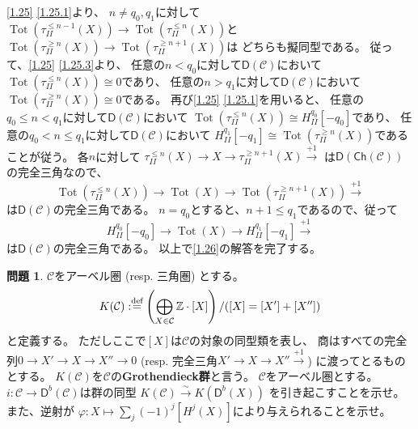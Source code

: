 \documentclass[uplatex,dvipdfmx]{jsarticle}
\makeatletter
\theoremstyle{definition}
\newtheorem{prob}[prob]{問題}
\renewenvironment{proof}[1][\proofname]{
  \pushQED{\qed}%
  \normalfont \topsep6\p@\@plus6\p@\relax
  \trivlist
  \item[\hskip\labelsep
    #1\@addpunct{\textbf{.}}]\ignorespaces
}{%
  \popQED\endtrivlist\@endpefalse
}
\providecommand{\proofname}{証明}
\DeclareMathOperator{\Tot}{\mathrm{Tot}}
\newcommand{\Ch}{\mathsf{Ch}}
\newcommand{\sfD}{\mathsf{D}}
\newcommand\Z{\mathbb{Z}}
\newcommand\mcC{\mathcal{C}}
\def\dfn{:\overset{\mbox{{\scriptsize def}}}{=}}
\makeatother
\begin{document}
\begin{proof}
  \autoref{1.25} \ref{1.25.1}より、
  \(n\neq q_0,q_1\)に対して
  \(\Tot(\tau_{II}^{\leq n-1}(X)) \to \Tot(\tau_{II}^{\leq n}(X))\)と
  \(\Tot(\tau_{II}^{\geq n}(X)) \to \Tot(\tau_{II}^{\geq n+1}(X))\)は
  どちらも擬同型である。
  従って、\autoref{1.25} \ref{1.25.3}より、
  任意の\(n < q_0\)に対して\(\sfD(\mcC)\)において
  \(\Tot(\tau_{II}^{\leq n}(X)) \cong 0\)であり、
  任意の\(n > q_1\)に対して\(\sfD(\mcC)\)において
  \(\Tot(\tau_{II}^{\geq n}(X)) \cong 0\)である。
  再び\autoref{1.25} \ref{1.25.1}を用いると、
  任意の\(q_0 \leq n < q_1\)に対して\(\sfD(\mcC)\)において
  \(\Tot(\tau_{II}^{\leq n}(X)) \cong H_{II}^{q_0}[-q_0]\)であり、
  任意の\(q_0 < n \leq q_1\)に対して\(\sfD(\mcC)\)において
  \(H_{II}^{q_1}[-q_1] \cong \Tot(\tau_{II}^{\geq n}(X))\)であることが従う。
  各\(n\)に対して
  \(\tau_{II}^{\leq n}(X) \to X \to \tau_{II}^{\geq n+1}(X)\xrightarrow{+1}\)
  は\(\sfD(\Ch(\mcC))\)の完全三角なので、
  \[
  \Tot(\tau_{II}^{\leq n}(X)) \to \Tot(X)
  \to \Tot(\tau_{II}^{\geq n+1}(X)) \xrightarrow{+1}
  \]
  は\(\sfD(\mcC)\)の完全三角である。
  \(n=q_0\)とすると、\(n+1\leq q_1\)であるので、従って
  \[
  H_{II}^{q_0}[-q_0] \to \Tot(X) \to H_{II}^{q_1}[-q_1] \xrightarrow{+1}
  \]
  は\(\sfD(\mcC)\)の完全三角である。
  以上で\autoref{1.26}の解答を完了する。
\end{proof}






\begin{prob}\label{1.27}
  \(\mcC\)をアーベル圏 (resp. 三角圏) とする。
  \[K(\mcC)\dfn \left(\bigoplus_{X\in \mcC} \Z\cdot [X]\right)/([X]=[X']+[X''])\]
  と定義する。
  ただしここで\([X]\)は\(\mcC\)の対象の同型類を表し、
  商はすべての完全列\(0\to X'\to X\to X''\to 0\)
  (resp. 完全三角\(X'\to X \to X'' \xrightarrow{+1}\))
  に渡ってとるものとする。
  \(K(\mcC)\)を\(\mcC\)の\textbf{Grothendieck群}と言う。
  \(\mcC\)をアーベル圏とする。
  \(i:\mcC \to \sfD^b(\mcC)\)は群の同型
  \(K(\mcC) \xrightarrow{\sim} K(\sfD^b(X))\)
  を引き起こすことを示せ。
  また、逆射が
  \(\varphi:X\mapsto \sum_j(-1)^j[H^j(X)]\)により与えられることを示せ。
\end{prob}
\end{document}
